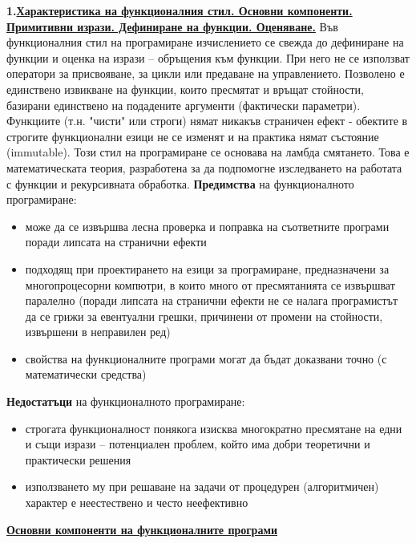\documentclass{article}
\begin{document}
\textbf{1.\underline{Характеристика на функционалния стил. Основни компоненти.} \\ \underline{Примитивни изрази.
Дефиниране на функции. Оценяване.}} \newline\newline
Във функционалния стил на програмиране изчислението се свежда до дефиниране на функции и оценка на изрази – обръщения към функции. При него не
се използват оператори за присвояване, за цикли или предаване на управлението. Позволено е единствено извикване на функции, които пресмятат и връщат
стойности, базирани единствено на подадените аргументи (фактически параметри). Функциите (т.н. "чисти" или строги) нямат никакъв страничен
ефект - обектите в строгите функционални езици не се изменят и на практика нямат състояние (immutable). Този стил на програмиране се основава на ламбда
смятането. Това е математическата теория, разработена за да подпомогне изследването на работата с функции и рекурсивната обработка. \newline\newline
\textbf{Предимства} на функционалното програмиране:
\begin{itemize}
    \item може да се извършва лесна проверка и поправка на съответните програми поради липсата на странични ефекти
    \item подходящ при проектирането на езици за програмиране, предназначени за многопроцесорни компютри, в които
    много от пресмятанията се извършват паралелно (поради липсата на странични ефекти не се налага програмистът
    да се грижи за евентуални грешки, причинени от промени на стойности, извършени в
    неправилен ред)
    \item свойства на функционалните програми могат да бъдат доказвани точно (с математически средства)
\end{itemize}
\textbf{Недостатъци} на функционалното програмиране:
\begin{itemize}
    \item строгата функционалност понякога изисква многократно пресмятане на едни и същи изрази – потенциален проблем, който
    има добри теоретични и практически решения
    \item използването му при решаване на задачи от процедурен (алгоритмичен) характер е неестествено и често неефективно
\end{itemize}
\textbf{\underline{Основни компоненти на функционалните програми}} \newline\newline
\end{document}

